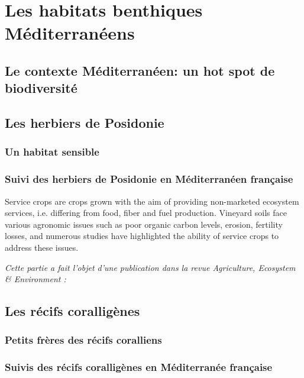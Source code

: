 

\section{Les habitats benthiques Méditerranéens}
\subsection{Le contexte Méditerranéen: un hot spot de biodiversité}

\subsection{Les herbiers de Posidonie}
\subsubsection{Un habitat sensible}
\subsubsection{Suivi des herbiers de Posidonie en Méditerranéen française}

Service crops are crops grown with the aim of providing non-marketed ecosystem services, i.e. differing from food, fiber and fuel production. Vineyard soils face various agronomic issues such as poor organic carbon levels, erosion, fertility losses, and numerous studies have highlighted the ability of service crops to address these issues.

\noindent\textit{Cette partie a fait l'objet d'une publication dans la revue Agriculture, Ecosystem \& Environment :}

\subsection{Les récifs coralligènes}
\subsubsection{Petits frères des récifs coralliens}
\subsubsection{Suivis des récifs coralligènes en Méditerranée française}

